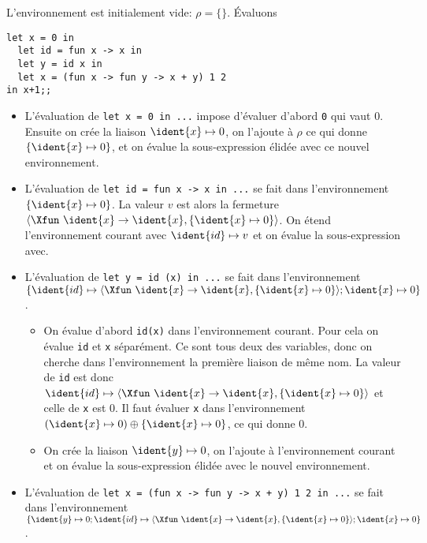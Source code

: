 L'environnement est initialement vide: $\rho = \{\}$. Évaluons
{\small
\begin{verbatim}
let x = 0 in
  let id = fun x -> x in
  let y = id x in
  let x = (fun x -> fun y -> x + y) 1 2 
in x+1;;
\end{verbatim}
}
\begin{itemize}

  \item L'évaluation de {\small \verb|let x = 0 in ...|} impose
  d'évaluer d'abord \texttt{0} qui vaut $0$. Ensuite on crée la
  liaison $\ident{x} \mapsto 0$, on l'ajoute à $\rho$ ce qui donne
  $\{\ident{x} \mapsto 0\}$, et on évalue la sous-expression élidée avec
  ce nouvel environnement.

  \item L'évaluation de {\small \verb|let id = fun x -> x in ...|} se
  fait dans l'environnement $\{\ident{x} \mapsto 0\}$. La valeur $v$ est
  alors la fermeture $\langle\Xfun \,\, \ident{x} \rightarrow \ident{x},
  \{\ident{x} \mapsto 0\}\rangle$. On étend l'environnement courant avec
  $\ident{id} \mapsto v$ et on évalue la sous-expression avec.

  \item L'évaluation de {\small \verb|let y = id (x) in ...|} se fait
  dans l'environnement $\{\ident{id} \mapsto \langle\Xfun \,\, \ident{x}
  \rightarrow \ident{x}, \{\ident{x} \mapsto 0\}\rangle; \ident{x} \mapsto
  0\}$. 
  \begin{itemize}

    \item On évalue d'abord \verb|id(x)| dans l'environnement 
    courant. Pour cela on évalue \texttt{id} et \texttt{x}
    séparément. Ce sont tous deux des variables, donc on cherche dans
    l'environnement la première liaison de même nom. La valeur de
    \texttt{id} est donc $\ident{id} \mapsto \langle\Xfun \,\, \ident{x}
    \rightarrow \ident{x}, \{\ident{x} \mapsto 0\}\rangle$ et celle de
    \texttt{x} est 0. Il faut évaluer \texttt{x} dans l'environnement
    $(\ident{x} \mapsto 0) \oplus \{\ident{x} \mapsto 0\}$, ce qui donne 0.

    \item On crée la liaison $\ident{y} \mapsto 0$, on l'ajoute à
    l'environnement courant et on évalue la sous-expression élidée
    avec le nouvel environnement.
 
  \end{itemize}

  \item L'évaluation de {\small
    \verb|let x = (fun x -> fun y -> x + y) 1 2 in ...|} se fait
 dans l'environnement $\{\ident{y} \mapsto 0; \ident{id} \mapsto
 \langle\Xfun \,\, \ident{x} \rightarrow \ident{x}, \{\ident{x}
 \mapsto 0\}\rangle; \ident{x} \mapsto 0\}$.

\end{itemize}

